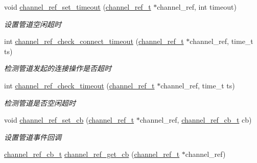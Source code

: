 \begin{DoxyCompactItemize}
void \hyperlink{a00101_ga4e46196f7ac40bdd14a1407167e88b7b_ga4e46196f7ac40bdd14a1407167e88b7b}{channel\+\_\+ref\+\_\+set\+\_\+timeout} (\hyperlink{a00050_a151271c9d188ef28d4d24bb81dcc1263_a151271c9d188ef28d4d24bb81dcc1263}{channel\+\_\+ref\+\_\+t} $\ast$channel\+\_\+ref, int timeout)
\begin{DoxyCompactList}\small\item\em 设置管道空闲超时 \end{DoxyCompactList}\item 
int \hyperlink{a00047_a1f03dc2b266c99aa3189dbe02564be45_a1f03dc2b266c99aa3189dbe02564be45}{channel\+\_\+ref\+\_\+check\+\_\+connect\+\_\+timeout} (\hyperlink{a00050_a151271c9d188ef28d4d24bb81dcc1263_a151271c9d188ef28d4d24bb81dcc1263}{channel\+\_\+ref\+\_\+t} $\ast$channel\+\_\+ref, time\+\_\+t ts)
\begin{DoxyCompactList}\small\item\em 检测管道发起的连接操作是否超时 \end{DoxyCompactList}\item 
int \hyperlink{a00047_ae0c46cab3e683bce5f93d07847db7ec1_ae0c46cab3e683bce5f93d07847db7ec1}{channel\+\_\+ref\+\_\+check\+\_\+timeout} (\hyperlink{a00050_a151271c9d188ef28d4d24bb81dcc1263_a151271c9d188ef28d4d24bb81dcc1263}{channel\+\_\+ref\+\_\+t} $\ast$channel\+\_\+ref, time\+\_\+t ts)
\begin{DoxyCompactList}\small\item\em 检测管道是否空闲超时 \end{DoxyCompactList}\item 
void \hyperlink{a00101_ga7627dbcdb87269ef2fae5bcbbb210720_ga7627dbcdb87269ef2fae5bcbbb210720}{channel\+\_\+ref\+\_\+set\+\_\+cb} (\hyperlink{a00050_a151271c9d188ef28d4d24bb81dcc1263_a151271c9d188ef28d4d24bb81dcc1263}{channel\+\_\+ref\+\_\+t} $\ast$channel\+\_\+ref, \hyperlink{a00050_ae296ec4d1ce108960de8dcc423956a1d_ae296ec4d1ce108960de8dcc423956a1d}{channel\+\_\+ref\+\_\+cb\+\_\+t} cb)
\begin{DoxyCompactList}\small\item\em 设置管道事件回调 \end{DoxyCompactList}\item 
\hyperlink{a00050_ae296ec4d1ce108960de8dcc423956a1d_ae296ec4d1ce108960de8dcc423956a1d}{channel\+\_\+ref\+\_\+cb\+\_\+t} \hyperlink{a00047_a1495c5893bdd3bf7508c0d13c7a591a6_a1495c5893bdd3bf7508c0d13c7a591a6}{channel\+\_\+ref\+\_\+get\+\_\+cb} (\hyperlink{a00050_a151271c9d188ef28d4d24bb81dcc1263_a151271c9d188ef28d4d24bb81dcc1263}{channel\+\_\+ref\+\_\+t} $\ast$channel\+\_\+ref)

\end{DoxyCompactItemize}
